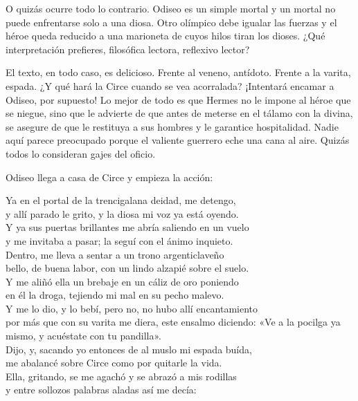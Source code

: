 O quizás ocurre todo lo contrario. Odiseo es un simple mortal y un mortal no puede enfrentarse solo a una diosa. Otro olímpico debe igualar las fuerzas y el héroe queda reducido a una marioneta de cuyos hilos tiran los dioses. ¿Qué interpretación prefieres, filosófica lectora, reflexivo lector?

El texto, en todo caso, es delicioso. Frente al veneno, antídoto. Frente a la varita, espada. ¿Y qué hará la Circe cuando se vea acorralada? ¡Intentará encamar a Odiseo, por supuesto! Lo mejor de todo es que Hermes no le impone al héroe que se niegue, sino que le advierte de que antes de meterse en el tálamo con la divina, se asegure de que le restituya a sus hombres y le garantice hospitalidad. Nadie aquí parece preocupado porque el valiente guerrero eche una cana al aire. Quizás todos lo consideran gajes del oficio.

Odiseo llega a casa de Circe y empieza la acción:

\begin{versocita}
Ya en el portal de la trencigalana deidad, me detengo,\\
y allí parado le grito, y la diosa mi voz ya está oyendo.\\
Y ya sus puertas brillantes me abría saliendo en un vuelo\\
y me invitaba a pasar; la seguí con el ánimo inquieto.\\
Dentro, me lleva a sentar a un trono argenticlaveño\\
bello, de buena labor, con un lindo alzapié sobre el suelo.\\
Y me aliñó ella un brebaje en un cáliz de oro poniendo\\
en él la droga, tejiendo mi mal en su pecho malevo.\\
Y me lo dio, y lo bebí, pero no, no hubo allí encantamiento\\
por más que con su varita me diera, este ensalmo diciendo:
\stanzabreak
«Ve a la pocilga ya mismo, y acuéstate con tu pandilla».\\
Dijo, y, sacando yo entonces de al muslo mi espada buída,\\
me abalancé sobre Circe como por quitarle la vida.\\
Ella, gritando, se me agachó y se abrazó a mis rodillas\\
y entre sollozos palabras aladas así me decía:
\end{versocita}

